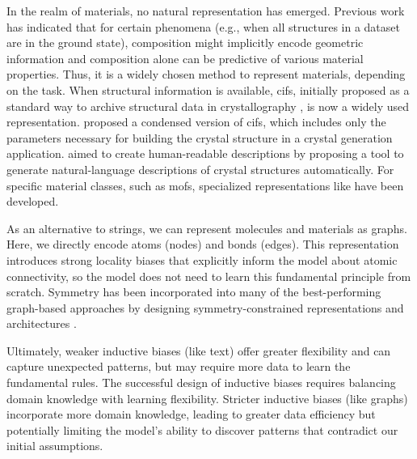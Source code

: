 In the realm of materials, no natural representation has emerged.  
Previous work has indicated that for certain phenomena (e.g., when all structures in a dataset are in the ground state), composition might implicitly encode geometric information \autocite{tian2022information, Jha_2018, Wang_2021} and composition alone can be predictive of various material properties. Thus, it is a widely chosen method to represent materials, depending on the task. 
When structural information is available, \glspl{cif}, initially proposed as a standard way to archive structural data in crystallography \autocite{hall1991crystallographic}, is now a widely used representation. \textcite{gruver2024finetuned, antunes2024crystal} proposed a condensed version of \glspl{cif}, which includes only the parameters necessary for building the crystal structure in a crystal generation application. \textcite{ganose2019robocrystallographer} aimed to create human-readable descriptions by proposing a tool to generate natural-language descriptions of crystal structures automatically. 
For specific material classes, such as \glspl{mof}, specialized representations like  \autocite{Bucior_2019} have been developed. 


As an alternative to strings, we can represent molecules and materials as graphs. 
Here, we directly encode atoms (nodes) and bonds (edges). 
This representation introduces strong locality biases that explicitly inform the model about atomic connectivity, so the model does not need to learn this fundamental principle from scratch. 
Symmetry has been incorporated into many of the best-performing graph-based approaches by designing symmetry-constrained representations \autocite{Langer_2022, Musil_2021} and architectures \autocite{satorras2021n, Batzner_2022}. 

Ultimately, weaker inductive biases (like text) offer greater flexibility and can capture unexpected patterns, but may require more data to learn the fundamental rules. 
The successful design of inductive biases requires balancing domain knowledge with learning flexibility. 
Stricter inductive biases (like graphs) incorporate more domain knowledge, leading to greater data efficiency but potentially limiting the model's ability to discover patterns that contradict our initial assumptions. 

